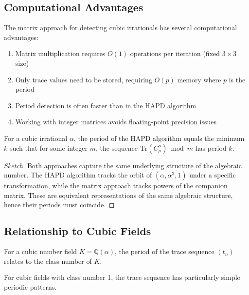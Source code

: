 \subsection{Computational Advantages}

\begin{proposition}[Efficiency]
The matrix approach for detecting cubic irrationals has several computational advantages:
\begin{enumerate}
    \item Matrix multiplication requires $O(1)$ operations per iteration (fixed $3 \times 3$ size)
    \item Only trace values need to be stored, requiring $O(p)$ memory where $p$ is the period
    \item Period detection is often faster than in the HAPD algorithm
    \item Working with integer matrices avoids floating-point precision issues
\end{enumerate}
\end{proposition}

\begin{theorem}
For a cubic irrational $\alpha$, the period of the HAPD algorithm equals the minimum $k$ such that for some integer $m$, the sequence $\text{Tr}(C_p^n) \bmod m$ has period $k$.
\end{theorem}

\begin{proof}[Sketch]
Both approaches capture the same underlying structure of the algebraic number. The HAPD algorithm tracks the orbit of $(\alpha, \alpha^2, 1)$ under a specific transformation, while the matrix approach tracks powers of the companion matrix. These are equivalent representations of the same algebraic structure, hence their periods must coincide.
\end{proof}

\subsection{Relationship to Cubic Fields}

\begin{theorem}
For a cubic number field $K = \mathbb{Q}(\alpha)$, the period of the trace sequence $(t_n)$ relates to the class number of $K$.
\end{theorem}

\begin{corollary}
For cubic fields with class number 1, the trace sequence has particularly simple periodic patterns.
\end{corollary}

